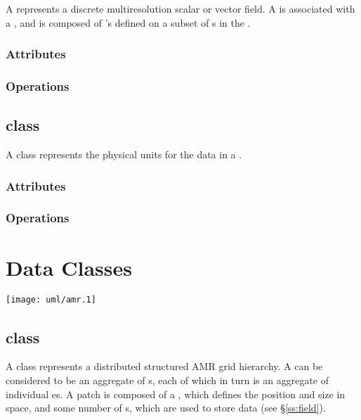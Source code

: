\documentclass{article}
\begin{document}
A  represents a discrete multiresolution scalar or vector
field.  A  is associated with a , and is
composed of 's defined on a subset of s in the
.

\subsubsection{Attributes}

\subsubsection{Operations}

\subsection{ class}

A  class represents the physical units for the data in a
.

\subsubsection{Attributes}

\subsubsection{Operations}

\newpage

\section{Data Classes} \label{s:data-classes}

\centerline{\texttt{[image: uml/amr.1]}}

\subsection{ class}

A  class represents a distributed structured AMR grid
hierarchy.  A  can be considered to be an aggregate of
s, each of which in turn is an aggregate of individual
es.  A patch is composed of a , which defines
the position and size in space, and some number of s, which
are used to store  data (see \S\ref{ss:field}).
\end{document}
